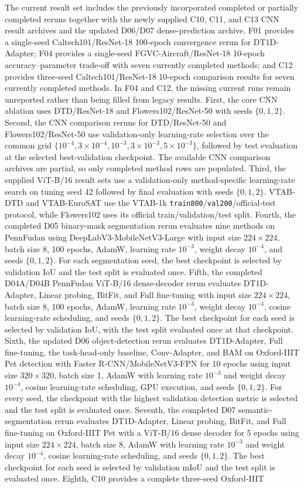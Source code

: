 \documentclass[pdflatex,sn-mathphys-num]{sn-jnl}
\theoremstyle{thmstyleone}
\theoremstyle{thmstyletwo}
\theoremstyle{thmstylethree}
\begin{document}
The current result set includes the previously incorporated completed or partially completed reruns together with the newly supplied C10, C11, and C13 CNN result archives and the updated D06/D07 dense-prediction archive. F01 provides a single-seed Caltech101/ResNet-18 100-epoch convergence rerun for DT1D-Adapter; F04 provides a single-seed FGVC-Aircraft/ResNet-18 10-epoch accuracy--parameter trade-off with seven currently completed methods; and C12 provides three-seed Caltech101/ResNet-18 10-epoch comparison results for seven currently completed methods. In F04 and C12, the missing current runs remain unreported rather than being filled from legacy results. First, the core CNN ablation uses DTD/ResNet-18 and Flowers102/ResNet-50 with seeds $\{0,1,2\}$. Second, the CNN comparison reruns for DTD/ResNet-50 and Flowers102/ResNet-50 use validation-only learning-rate selection over the common grid $\{10^{-4},3\times10^{-4},10^{-3},3\times10^{-3},5\times10^{-3}\}$, followed by test evaluation at the selected best-validation checkpoint. The available CNN comparison archives are partial, so only completed method rows are populated. Third, the supplied ViT-B/16 result sets use a validation-only method-specific learning-rate search on tuning seed 42 followed by final evaluation with seeds $\{0,1,2\}$. VTAB-DTD and VTAB-EuroSAT use the VTAB-1k \texttt{train800}/\texttt{val200}/official-test protocol, while Flowers102 uses its official train/validation/test split. Fourth, the completed D05 binary-mask segmentation rerun evaluates nine methods on PennFudan using DeepLabV3-MobileNetV3-Large with input size $224\times224$, batch size 8, 100 epochs, AdamW, learning rate $10^{-3}$, weight decay $10^{-4}$, and seeds $\{0,1,2\}$. For each segmentation seed, the best checkpoint is selected by validation IoU and the test split is evaluated once. Fifth, the completed D04A/D04B PennFudan ViT-B/16 dense-decoder rerun evaluates DT1D-Adapter, Linear probing, BitFit, and Full fine-tuning with input size $224\times224$, batch size 8, 100 epochs, AdamW, learning rate $10^{-3}$, weight decay $10^{-4}$, cosine learning-rate scheduling, and seeds $\{0,1,2\}$. The best checkpoint for each seed is selected by validation IoU, with the test split evaluated once at that checkpoint. Sixth, the updated D06 object-detection rerun evaluates DT1D-Adapter, Full fine-tuning, the task-head-only baseline, Conv-Adapter, and BAM on Oxford-IIIT Pet detection with Faster R-CNN/MobileNetV3-FPN for 10 epochs using input size $320\times320$, batch size 1, AdamW with learning rate $10^{-3}$ and weight decay $10^{-4}$, cosine learning-rate scheduling, GPU execution, and seeds $\{0,1,2\}$. For every seed, the checkpoint with the highest validation detection metric is selected and the test split is evaluated once. Seventh, the completed D07 semantic-segmentation rerun evaluates DT1D-Adapter, Linear probing, BitFit, and Full fine-tuning on Oxford-IIIT Pet with a ViT-B/16 dense decoder for 5 epochs using input size $224\times224$, batch size 8, AdamW with learning rate $10^{-3}$ and weight decay $10^{-4}$, cosine learning-rate scheduling, and seeds $\{0,1,2\}$. The best checkpoint for each seed is selected by validation mIoU and the test split is evaluated once. Eighth, C10 provides a complete three-seed Oxford-IIIT 
\end{document}

